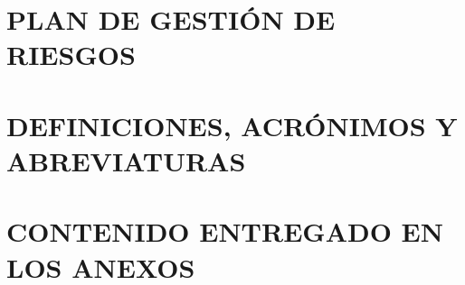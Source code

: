 \section*{PLAN DE GESTIÓN DE RIESGOS}
{}
\hypertarget{anexo:plan_de_gestion_de_riesgos}{}


\newpage
\section*{DEFINICIONES, ACRÓNIMOS Y ABREVIATURAS}
{}


\newpage
\section*{CONTENIDO ENTREGADO EN LOS ANEXOS} 
